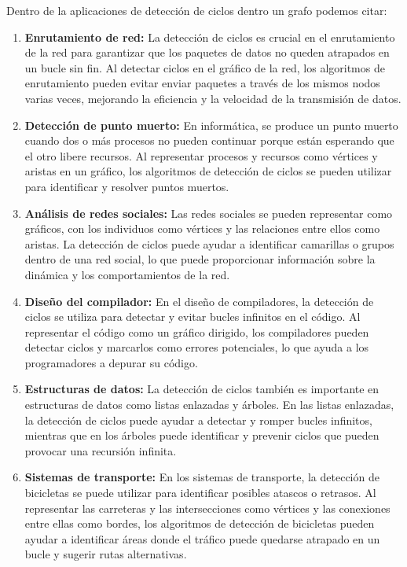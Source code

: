 Dentro de la aplicaciones de detección de ciclos dentro un grafo podemos citar:
\begin{enumerate}
\item \textbf{Enrutamiento de red:}
La detección de ciclos es crucial en el enrutamiento de la red para garantizar que los paquetes de datos no queden atrapados en un bucle sin fin. Al detectar ciclos en el gráfico de la red, los algoritmos de enrutamiento pueden evitar enviar paquetes a través de los mismos nodos varias veces, mejorando la eficiencia y la velocidad de la transmisión de datos.

\item \textbf{Detección de punto muerto:}
En informática, se produce un punto muerto cuando dos o más procesos no pueden continuar porque están esperando que el otro libere recursos. Al representar procesos y recursos como vértices y aristas en un gráfico, los algoritmos de detección de ciclos se pueden utilizar para identificar y resolver puntos muertos.

\item \textbf{Análisis de redes sociales:}
Las redes sociales se pueden representar como gráficos, con los individuos como vértices y las relaciones entre ellos como aristas. La detección de ciclos puede ayudar a identificar camarillas o grupos dentro de una red social, lo que puede proporcionar información sobre la dinámica y los comportamientos de la red.

\item \textbf{Diseño del compilador:}
En el diseño de compiladores, la detección de ciclos se utiliza para detectar y evitar bucles infinitos en el código. Al representar el código como un gráfico dirigido, los compiladores pueden detectar ciclos y marcarlos como errores potenciales, lo que ayuda a los programadores a depurar su código.

\item \textbf{Estructuras de datos:}
La detección de ciclos también es importante en estructuras de datos como listas enlazadas y árboles. En las listas enlazadas, la detección de ciclos puede ayudar a detectar y romper bucles infinitos, mientras que en los árboles puede identificar y prevenir ciclos que pueden provocar una recursión infinita.

\item \textbf{Sistemas de transporte:}
En los sistemas de transporte, la detección de bicicletas se puede utilizar para identificar posibles atascos o retrasos. Al representar las carreteras y las intersecciones como vértices y las conexiones entre ellas como bordes, los algoritmos de detección de bicicletas pueden ayudar a identificar áreas donde el tráfico puede quedarse atrapado en un bucle y sugerir rutas alternativas.


\end{enumerate}
